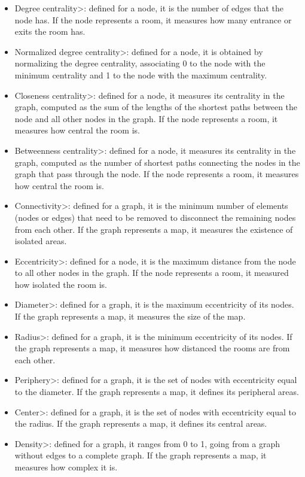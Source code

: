 \begin{itemize}
\item \<Degree centrality>: defined for a node, it is the number of edges that the node has. If the node represents a room, it measures how many entrance or exits the room has. 
\item \<Normalized degree centrality>: defined for a node, it is obtained by normalizing the degree centrality, associating 0 to the node with the minimum centrality and 1 to the node with the maximum centrality.
\item \<Closeness centrality>: defined for a node, it measures its centrality in the graph, computed as the sum of the lengths of the shortest paths between the node and all other nodes in the graph. If the node represents a room, it measures how central the room is.
\item \<Betweenness centrality>: defined for a node, it measures its centrality in the graph, computed as the number of shortest paths connecting the nodes in the graph that pass through the node. If the node represents a room, it measures how central the room is.
\item \<Connectivity>: defined for a graph, it is the minimum number of elements (nodes or edges) that need to be removed to disconnect the remaining nodes from each other. If the graph represents a map, it measures the existence of isolated areas.
\item \<Eccentricity>: defined for a node, it is the maximum distance from the node to all other nodes in the graph. If the node represents a room, it measured how isolated the room is.
\item \<Diameter>: defined for a graph, it is the maximum eccentricity of its nodes. If the graph represents a map, it measures the size of the map.
\item \<Radius>: defined for a graph, it is the minimum eccentricity of its nodes. If the graph represents a map, it measures how distanced the rooms are from each other.
\item \<Periphery>: defined for a graph, it is the set of nodes with eccentricity equal to the diameter. If the graph represents a map, it defines its peripheral areas.
\item \<Center>: defined for a graph, it is the set of nodes with eccentricity equal to the radius. If the graph represents a map, it defines its central areas.
\item \<Density>: defined for a graph, it ranges from 0 to 1, going from a graph without edges to a complete graph. If the graph represents a map, it measures how complex it is.
\end{itemize}


